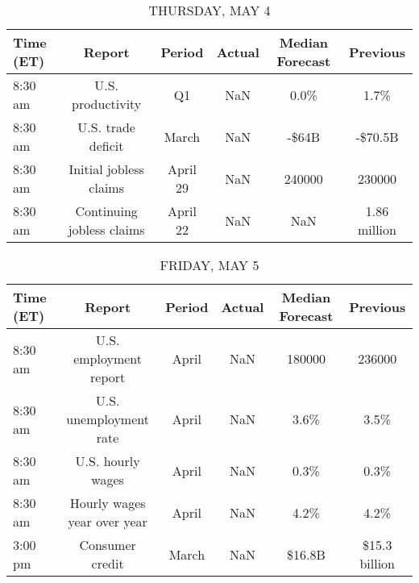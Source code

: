 \documentclass{article}%
\begin{document}
%


\begin{table}[htbp]%
\caption{THURSDAY, MAY 4}%
\centering%
\begin{adjustbox}{width=1\textwidth}%
\begin{tabular}{lccccc}
\toprule
Time (ET) &                    Report &   Period & Actual & Median Forecast &     Previous \\
\midrule
  8:30 am &         U.S. productivity &       Q1 &    NaN &            0.0\% &         1.7\% \\
  8:30 am &        U.S. trade deficit &    March &    NaN &           -\$64B &      -\$70.5B \\
  8:30 am &    Initial jobless claims & April 29 &    NaN &          240000 &       230000 \\
  8:30 am & Continuing jobless claims & April 22 &    NaN &             NaN & 1.86 million \\
\bottomrule
\end{tabular}
%
\end{adjustbox}%
\end{table}

%


\begin{table}[htbp]%
\caption{FRIDAY, MAY 5}%
\centering%
\begin{adjustbox}{width=1\textwidth}%
\begin{tabular}{lccccc}
\toprule
Time (ET) &                      Report & Period & Actual & Median Forecast &      Previous \\
\midrule
  8:30 am &      U.S. employment report &  April &    NaN &          180000 &        236000 \\
  8:30 am &      U.S. unemployment rate &  April &    NaN &            3.6\% &          3.5\% \\
  8:30 am &           U.S. hourly wages &  April &    NaN &            0.3\% &          0.3\% \\
  8:30 am & Hourly wages year over year &  April &    NaN &            4.2\% &          4.2\% \\
  3:00 pm &             Consumer credit &  March &    NaN &          \$16.8B & \$15.3 billion \\
\bottomrule
\end{tabular}
%
\end{adjustbox}%
\end{table}
\end{document}
